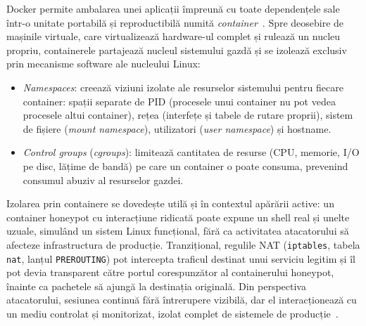Docker permite ambalarea unei aplicații împreună cu toate dependențele sale într-o unitate
portabilă și reproductibilă numită \textit{container}~\cite{merkel2014docker}. Spre deosebire
de mașinile virtuale, care virtualizează hardware-ul complet și rulează un nucleu propriu,
containerele partajează nucleul sistemului gazdă și se izolează exclusiv prin mecanisme
software ale nucleului Linux:

\begin{itemize}
  \item \textit{Namespaces}: creează viziuni izolate ale resurselor sistemului pentru fiecare
    container: spații separate de PID (procesele unui container nu pot vedea procesele altui
    container), rețea (interfețe și tabele de rutare proprii), sistem de fișiere
    (\textit{mount namespace}), utilizatori (\textit{user namespace}) și hostname.
  \item \textit{Control groups} (\textit{cgroups}): limitează cantitatea de resurse (CPU,
    memorie, I/O pe disc, lățime de bandă) pe care un container o poate consuma, prevenind
    consumul abuziv al resurselor gazdei.
\end{itemize}

Izolarea prin containere se dovedește utilă și în contextul apărării active: un container
honeypot cu interacțiune ridicată poate expune un shell real și unelte uzuale, simulând un
sistem Linux funcțional, fără ca activitatea atacatorului să afecteze infrastructura de
producție. Tranzițional, regulile NAT (\texttt{iptables}, tabela \texttt{nat}, lanțul
\texttt{PREROUTING}) pot intercepta traficul destinat unui serviciu legitim și îl pot devia
transparent către portul corespunzător al containerului honeypot, înainte ca pachetele să
ajungă la destinația originală. Din perspectiva atacatorului, sesiunea continuă fără întrerupere
vizibilă, dar el interacționează cu un mediu controlat și monitorizat, izolat complet de
sistemele de producție~\cite{spitzner2002honeypots,kerrisk2010linux}.
